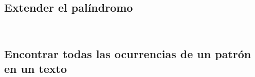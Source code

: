 \subsection{Extender el palíndromo}


\inputminted[linenos, frame=lines]{cpp}{problemas/cpp/EPALIN.cpp}
\pagebreak

\inputminted[linenos, frame=lines]{haskell}{problemas/haskell/EPALIN.hs}
\pagebreak

\subsection{Encontrar todas las ocurrencias de un patrón en un texto}


\inputminted[linenos, frame=lines]{cpp}{problemas/cpp/NHAY.cpp}
\pagebreak

\inputminted[linenos, frame=lines]{haskell}{problemas/haskell/NHAY.hs}
\pagebreak




